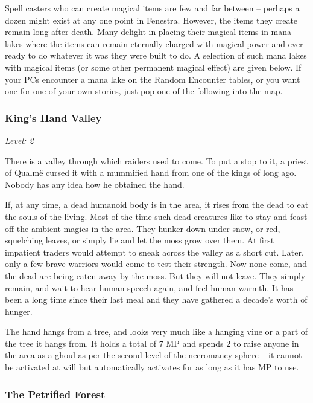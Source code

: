 Spell casters who can create magical items are few and far between -- perhaps a dozen might exist at any one point in Fenestra.  However, the items they create remain long after death.  Many delight in placing their magical items in mana lakes where the items can remain eternally charged with magical power and ever-ready to do whatever it was they were built to do.  A selection of such mana lakes with magical items (or some other permanent magical effect) are given below.  If your PCs encounter a mana lake on the Random Encounter tables, or you want one for one of your own stories, just pop one of the following into the map.

\subsubsection{King's Hand Valley}

\textit{Level: 2}

There is a valley through which raiders used to come.  To put a stop to it, a priest of Qualm\"{e} cursed it with a mummified hand from one of the kings of long ago.  Nobody has any idea how he obtained the hand.

If, at any time, a dead humanoid body is in the area, it rises from the dead to eat the souls of the living.  Most of the time such dead creatures like to stay and feast off the ambient magics in the area.  They hunker down under snow, or red, squelching leaves, or simply lie and let the moss grow over them.   At first impatient traders would attempt to sneak across the valley as a short cut.  Later, only a few brave warriors would come to test their strength.  Now none come, and the dead are being eaten away by the moss.  But they will not leave.  They simply remain, and wait to hear human speech again, and feel human warmth.  It has been a long time since their last meal and they have gathered a decade's worth of hunger.

The hand hangs from a tree, and looks very much like a hanging vine or a part of the tree it hangs from.  It holds a total of 7 MP and spends 2 to raise anyone in the area as a ghoul as per the second level of the necromancy sphere -- it cannot be activated at will but automatically activates for as long as it has MP to use.

\subsubsection{The Petrified Forest}

